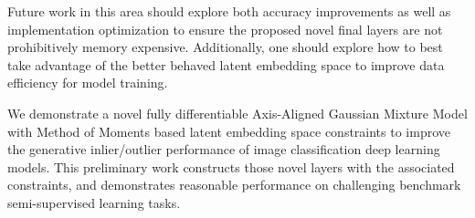 \documentclass[10pt,twocolumn,letterpaper]{article}
\begin{document}
Future work in this area should explore both accuracy improvements as well as implementation optimization to ensure the proposed novel final layers are not prohibitively memory expensive.
Additionally, one should explore how to best take advantage of the better behaved latent embedding space to improve data efficiency for model training. 

We demonstrate a novel fully differentiable Axis-Aligned Gaussian Mixture Model with Method of Moments based latent embedding space constraints to improve the generative inlier/outlier performance of image classification deep learning models. 
This preliminary work constructs those novel layers with the associated constraints, and demonstrates reasonable performance on challenging benchmark semi-supervised learning tasks.



{
	\small
	
	
}
\end{document}
